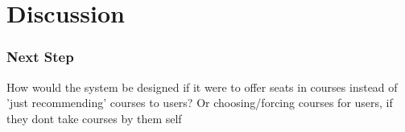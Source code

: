 \section{Discussion}
\subsubsection{Next Step}
How would the system be designed if it were to offer seats in courses instead of 'just recommending' courses to users? Or choosing/forcing courses for users, if they dont take courses by them self
